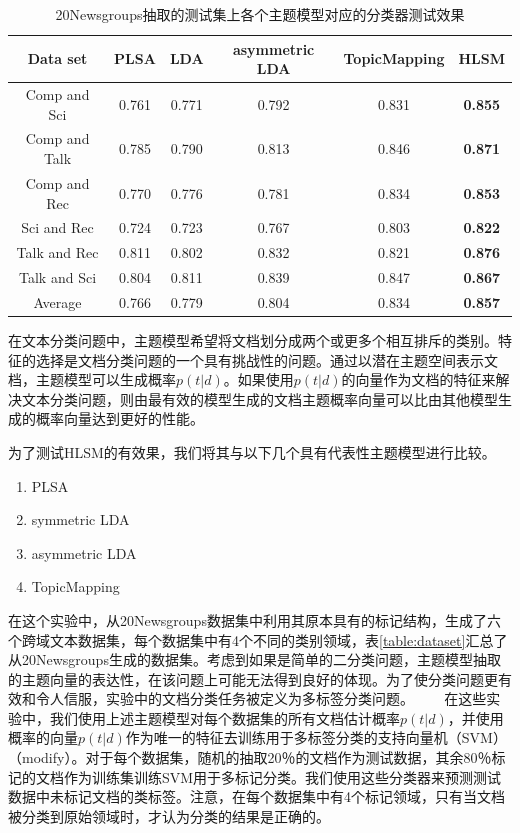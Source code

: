 \begin{table}[ht]
\centering
\caption{20Newsgroups抽取的测试集上各个主题模型对应的分类器测试效果}
{\scriptsize
\setlength{\extrarowheight}{3pt}
\baselineskip=11pt
\label{table:classification}
\begin{tabular}{|c|c|c|c|c|c|	}
\hline
Data set & PLSA & LDA & asymmetric LDA & TopicMapping & HLSM\\
\hline
 Comp and Sci & 0.761 & 0.771 & 0.792 & 0.831 & \textbf{0.855}\\
\hline
Comp and Talk & 0.785 & 0.790 & 0.813 & 0.846 & \textbf{0.871}\\
\hline
Comp and Rec & 0.770 & 0.776 & 0.781 & 0.834 & \textbf{0.853}\\
\hline
Sci and Rec & 0.724 & 0.723 & 0.767 & 0.803 & \textbf{0.822}\\
\hline
Talk and Rec & 0.811 & 0.802 & 0.832 & 0.821 & \textbf{0.876}\\
\hline
Talk and Sci & 0.804 & 0.811 & 0.839 & 0.847 & \textbf{0.867}\\
\hline
Average & 0.766 & 0.779 & 0.804 & 0.834 & \textbf{0.857} \\
\hline
\end{tabular}}
\end{table}

在文本分类问题中，主题模型希望将文档划分成两个或更多个相互排斥的类别。特征的选择是文档分类问题的一个具有挑战性的问题。通过以潜在主题空间表示文档，主题模型可以生成概率$ p(t|d) $。如果使用$ p(t|d)$的向量作为文档的特征来解决文本分类问题，则由最有效的模型生成的文档主题概率向量可以比由其他模型生成的概率向量达到更好的性能。

为了测试HLSM的有效果，我们将其与以下几个具有代表性主题模型进行比较。
  \begin{enumerate}[1.]
 \item PLSA
 \item symmetric LDA
 \item asymmetric LDA 
 \item TopicMapping
  \end{enumerate}
 
在这个实验中，从20Newsgroups数据集中利用其原本具有的标记结构，生成了六个跨域文本数据集，每个数据集中有4个不同的类别领域，表\ref{table:dataset}汇总了从20Newsgroups生成的数据集。考虑到如果是简单的二分类问题，主题模型抽取的主题向量的表达性，在该问题上可能无法得到良好的体现。为了使分类问题更有效和令人信服，实验中的文档分类任务被定义为多标签分类问题。
   
在这些实验中，我们使用上述主题模型对每个数据集的所有文档估计概率$p(t|d)$，并使用概率的向量$p(t|d)$作为唯一的特征去训练用于多标签分类的支持向量机（SVM）（modify）。对于每个数据集，随机的抽取20％的文档作为测试数据，其余80％标记的文档作为训练集训练SVM用于多标记分类。我们使用这些分类器来预测测试数据中未标记文档的类标签。注意，在每个数据集中有4个标记领域，只有当文档被分类到原始领域时，才认为分类的结果是正确的。

